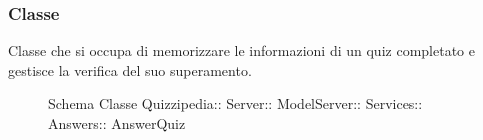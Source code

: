 \subsubsection{Classe }
Classe che si occupa di memorizzare le informazioni di un quiz completato e gestisce la verifica del suo superamento.
\begin{figure}[H]
\centering
\noindent{}
\caption[Schema Classe AnswerQuiz]{Schema Classe Quizzipedia:: Server:: ModelServer:: Services:: Answers:: AnswerQuiz}
\end{figure}
